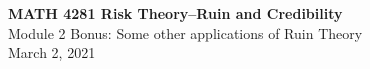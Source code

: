 \documentclass[11pt]{beamer}
\begin{document}
\begin{frame}
  \frametitle{}
  \begin{center}
    \textbf{\large MATH 4281 Risk Theory--Ruin and Credibility}\\
    \vspace{1cm}
    {\large  Module 2 Bonus: Some other applications of Ruin Theory} \\
    \vspace{1cm}
    {\large  March 2, 2021}
    \end{center}
    \vspace{1cm}
\end{frame}
\begin{frame}
\tableofcontents
\end{frame}
\end{document}

